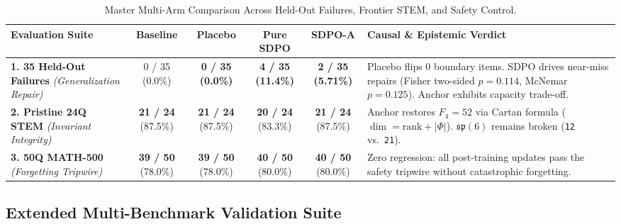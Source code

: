 \documentclass[11pt,a4paper]{article}
\begin{document}
\begin{table}[htbp]
\centering
\caption{Master Multi-Arm Comparison Across Held-Out Failures, Frontier STEM, and Safety Control.}
\label{tab:master_arms}
\small
\begin{tabular}{@{}p{3.4cm}ccccp{4.8cm}@{}}
\toprule
\textbf{Evaluation Suite} & \textbf{Baseline} & \textbf{Placebo} & \textbf{Pure SDPO} & \textbf{SDPO-A} & \textbf{Causal \& Epistemic Verdict} \\
\midrule
\textbf{1. 35 Held-Out Failures} \newline \textit{(Generalization Repair)} & 0 / 35 \newline (0.0\%) & \textbf{0 / 35} \newline \textbf{(0.0\%)} & \textbf{4 / 35} \newline \textbf{(11.4\%)} & \textbf{2 / 35} \newline \textbf{(5.71\%)} & Placebo flips 0 boundary items. SDPO drives near-miss repairs (Fisher two-sided $p=0.114$, McNemar $p=0.125$). Anchor exhibits capacity trade-off. \\
\addlinespace
\textbf{2. Pristine 24Q STEM} \newline \textit{(Invariant Integrity)} & \textbf{21 / 24} \newline (87.5\%) & \textbf{21 / 24} \newline (87.5\%) & \textbf{20 / 24} \newline (83.3\%) & \textbf{21 / 24} \newline (87.5\%) & Anchor restores $F_4=52$ via Cartan formula ($\dim = \mathrm{rank} + |\Phi|$). $\mathfrak{sp}(6)$ remains broken (\texttt{12} vs.\ \texttt{21}). \\
\addlinespace
\textbf{3. 50Q MATH-500} \newline \textit{(Forgetting Tripwire)} & \textbf{39 / 50} \newline (78.0\%) & \textbf{39 / 50} \newline (78.0\%) & \textbf{40 / 50} \newline (80.0\%) & \textbf{40 / 50} \newline (80.0\%) & Zero regression: all post-training updates pass the safety tripwire without catastrophic forgetting. \\
\bottomrule
\end{tabular}
\end{table}

\subsection{Extended Multi-Benchmark Validation Suite}
\end{document}

